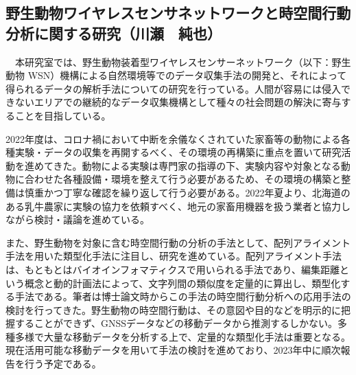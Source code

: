 \subsection{野生動物ワイヤレスセンサネットワークと時空間行動分析に関する研究（川瀬　純也）}
　本研究室では、野生動物装着型ワイヤレスセンサーネットワーク（以下：野生動物 WSN）機構による自然環境等でのデータ収集手法の開発と、それによって得られるデータの解析手法についての研究を行っている。人間が容易には侵入できないエリアでの継続的なデータ収集機構として種々の社会問題の解決に寄与することを目指している。
 
2022年度は、コロナ禍において中断を余儀なくされていた家畜等の動物による各種実験・データの収集を再開するべく、その環境の再構築に重点を置いて研究活動を進めてきた。動物による実験は専門家の指導の下、実験内容や対象となる動物に合わせた各種設備・環境を整えて行う必要があるため、その環境の構築と整備は慎重かつ丁寧な確認を繰り返して行う必要がある。2022年夏より、北海道のある乳牛農家に実験の協力を依頼すべく、地元の家畜用機器を扱う業者と協力しながら検討・議論を進めている。

 また、野生動物を対象に含む時空間行動の分析の手法として、配列アライメント手法を用いた類型化手法に注目し、研究を進めている。配列アライメント手法は、もともとはバイオインフォマティクスで用いられる手法であり、編集距離という概念と動的計画法によって、文字列間の類似度を定量的に算出し、類型化する手法である。筆者は博士論文時からこの手法の時空間行動分析への応用手法の検討を行ってきた。野生動物の時空間行動は、その意図や目的などを明示的に把握することができず、GNSSデータなどの移動データから推測するしかない。多種多様で大量な移動データを分析する上で、定量的な類型化手法は重要となる。現在活用可能な移動データを用いて手法の検討を進めており、2023年中に順次報告を行う予定である。